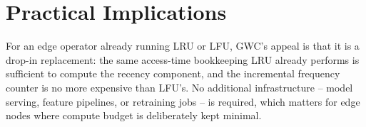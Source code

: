\section{Practical Implications}
For an edge operator already running LRU or LFU, GWC's appeal is that it is a drop-in
replacement: the same access-time bookkeeping LRU already performs is sufficient to compute
the recency component, and the incremental frequency counter is no more expensive than LFU's.
No additional infrastructure -- model serving, feature pipelines, or retraining jobs -- is
required, which matters for edge nodes where compute budget is deliberately kept minimal.
